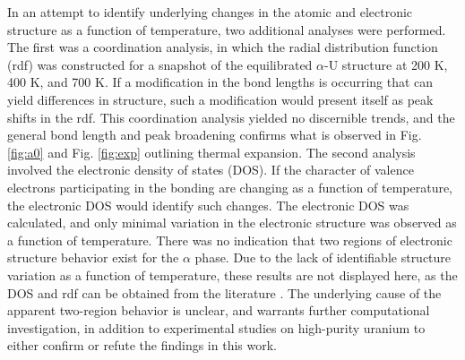 \documentclass[utf8]{frontiersSCNS} %
\begin{document}
In an attempt to identify underlying changes in the atomic and electronic structure as a function of temperature, two additional analyses were performed. The first was a coordination analysis, in which the radial distribution function (rdf) was constructed for a snapshot of the equilibrated $\alpha$-U structure at 200 K, 400 K, and 700 K. If a modification in the bond lengths is occurring that can yield differences in structure, such a modification would present itself as peak shifts in the rdf. This coordination analysis yielded no discernible trends, and the general bond length and peak broadening confirms what is observed in Fig. \ref{fig:a0} and Fig. \ref{fig:exp} outlining thermal expansion. The second analysis involved the electronic density of states (DOS). If the character of valence electrons participating in the bonding are changing as a function of temperature, the electronic DOS would identify such changes. The electronic DOS was calculated, and only minimal variation in the electronic structure was observed as a function of temperature. There was no indication that two regions of electronic structure behavior exist for the $\alpha$ phase. Due to the lack of identifiable structure variation as a function of temperature, these results are not displayed here, as the DOS and rdf can be obtained from the literature \cite{beeler2013,hood2008}. The underlying cause of the apparent two-region behavior is unclear, and warrants further computational investigation, in addition to experimental studies on high-purity uranium to either confirm or refute the findings in this work.
\end{document}

